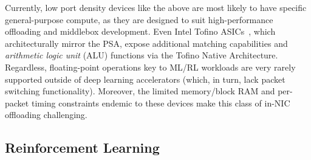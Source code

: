 \documentclass[
sigconf,natbib=false
]{acmart}
\newcounter{insightc}
\newenvironment{insight}
	{
		\begin{tipblock}\refstepcounter{insightc}\textbf{Insight \theinsightc:}\em
	}
	{
		\end{tipblock}
	}
\begin{document}
Currently, low port density devices like the above are most likely to have specific general-purpose compute, as they are designed to suit high-performance offloading and middlebox development.
Even Intel Tofino ASICs~\parencite{barefoot-intel}, which architecturally mirror the PSA, expose additional matching capabilities and \emph{arithmetic logic unit} (ALU) functions via the Tofino Native Architecture.
Regardless, floating-point operations key to ML/RL workloads are very rarely supported outside of deep learning accelerators (which, in turn, lack packet switching functionality).
Moreover, the limited memory/block RAM and per-packet timing constraints endemic to these devices make this class of in-NIC offloading challenging.


\subsection{Reinforcement Learning}
%
\end{document}
